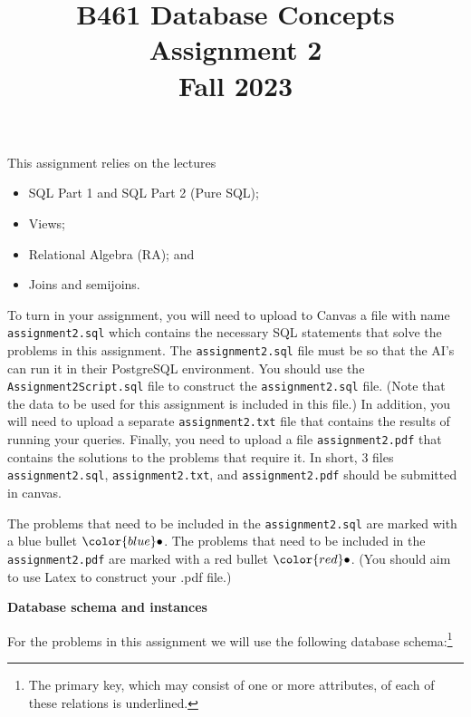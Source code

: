 \documentclass[11pt]{article}
\newcommand{\red}[1]{{\color{red}#1}}
\newcommand{\blue}[1]{{\color{blue}#1}}
\newcommand{\redbullet}{$\red{\bullet}$}
\newcommand{\bluebullet}{$\blue{\bullet}$}
\begin{document}
\title{B461 Database Concepts \\Assignment 2 \\Fall 2023}
\author{}
\date{}
\maketitle

This {assignment} relies on the lectures
\begin{itemize}
\item SQL Part 1 and SQL Part 2 (Pure SQL);
\item Views;
\item Relational Algebra (RA);  and 
\item Joins and semijoins. 
\end{itemize}

To turn in your assignment, you will need to upload to Canvas a file with name {\tt assignment2.sql} which contains 
the necessary SQL statements that solve the problems in this assignment.   
The {\tt assignment2.sql} file must be so that the AI's can run it in their PostgreSQL environment.  
You should use the {\tt Assignment2Script.sql} file to construct the {\tt assignment2.sql} file. (Note that the data to be used for this assignment is included in this file.)
In addition, you will need to upload a separate {\tt assignment2.txt} file that contains the results of running
your queries.
Finally, you need to upload a file {\tt assignment2.pdf} that contains the solutions to the problems that require it.
In short, 3 files {\tt assignment2.sql}, {\tt assignment2.txt}, and {\tt assignment2.pdf} should be submitted in canvas.


The problems that need to be included in the {\tt assignment2.sql} are marked with a blue bullet \bluebullet.
The problems that need to be included in the {\tt assignment2.pdf} are marked with a red bullet \redbullet.
(You should aim to use Latex to construct your .pdf file.)

\newpage
\noindent
\large{\bf Database schema and instances}
\bigskip




For the problems in this assignment we will use the following database schema:\footnote{The primary key, which may consist of one or more attributes, of each of these relations is underlined.}
\end{document}
